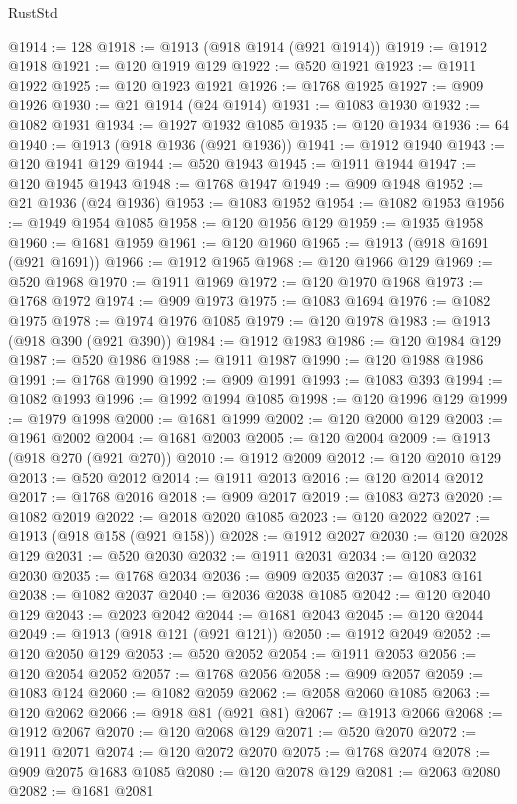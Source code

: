 \begin{lexlean}{RustStd}
\begin{coremodule}
@1914 := 128
@1918 := @1913 (@918 @1914 (@921 @1914))
@1919 := @1912 @1918
@1921 := @120 @1919 @129
@1922 := @520 @1921
@1923 := @1911 @1922
@1925 := @120 @1923 @1921
@1926 := @1768 @1925
@1927 := @909 @1926
@1930 := @21 @1914 (@24 @1914)
@1931 := @1083 @1930
@1932 := @1082 @1931
@1934 := @1927 @1932 @1085
@1935 := @120 @1934
@1936 := 64
@1940 := @1913 (@918 @1936 (@921 @1936))
@1941 := @1912 @1940
@1943 := @120 @1941 @129
@1944 := @520 @1943
@1945 := @1911 @1944
@1947 := @120 @1945 @1943
@1948 := @1768 @1947
@1949 := @909 @1948
@1952 := @21 @1936 (@24 @1936)
@1953 := @1083 @1952
@1954 := @1082 @1953
@1956 := @1949 @1954 @1085
@1958 := @120 @1956 @129
@1959 := @1935 @1958
@1960 := @1681 @1959
@1961 := @120 @1960
@1965 := @1913 (@918 @1691 (@921 @1691))
@1966 := @1912 @1965
@1968 := @120 @1966 @129
@1969 := @520 @1968
@1970 := @1911 @1969
@1972 := @120 @1970 @1968
@1973 := @1768 @1972
@1974 := @909 @1973
@1975 := @1083 @1694
@1976 := @1082 @1975
@1978 := @1974 @1976 @1085
@1979 := @120 @1978
@1983 := @1913 (@918 @390 (@921 @390))
@1984 := @1912 @1983
@1986 := @120 @1984 @129
@1987 := @520 @1986
@1988 := @1911 @1987
@1990 := @120 @1988 @1986
@1991 := @1768 @1990
@1992 := @909 @1991
@1993 := @1083 @393
@1994 := @1082 @1993
@1996 := @1992 @1994 @1085
@1998 := @120 @1996 @129
@1999 := @1979 @1998
@2000 := @1681 @1999
@2002 := @120 @2000 @129
@2003 := @1961 @2002
@2004 := @1681 @2003
@2005 := @120 @2004
@2009 := @1913 (@918 @270 (@921 @270))
@2010 := @1912 @2009
@2012 := @120 @2010 @129
@2013 := @520 @2012
@2014 := @1911 @2013
@2016 := @120 @2014 @2012
@2017 := @1768 @2016
@2018 := @909 @2017
@2019 := @1083 @273
@2020 := @1082 @2019
@2022 := @2018 @2020 @1085
@2023 := @120 @2022
@2027 := @1913 (@918 @158 (@921 @158))
@2028 := @1912 @2027
@2030 := @120 @2028 @129
@2031 := @520 @2030
@2032 := @1911 @2031
@2034 := @120 @2032 @2030
@2035 := @1768 @2034
@2036 := @909 @2035
@2037 := @1083 @161
@2038 := @1082 @2037
@2040 := @2036 @2038 @1085
@2042 := @120 @2040 @129
@2043 := @2023 @2042
@2044 := @1681 @2043
@2045 := @120 @2044
@2049 := @1913 (@918 @121 (@921 @121))
@2050 := @1912 @2049
@2052 := @120 @2050 @129
@2053 := @520 @2052
@2054 := @1911 @2053
@2056 := @120 @2054 @2052
@2057 := @1768 @2056
@2058 := @909 @2057
@2059 := @1083 @124
@2060 := @1082 @2059
@2062 := @2058 @2060 @1085
@2063 := @120 @2062
@2066 := @918 @81 (@921 @81)
@2067 := @1913 @2066
@2068 := @1912 @2067
@2070 := @120 @2068 @129
@2071 := @520 @2070
@2072 := @1911 @2071
@2074 := @120 @2072 @2070
@2075 := @1768 @2074
@2078 := @909 @2075 @1683 @1085
@2080 := @120 @2078 @129
@2081 := @2063 @2080
@2082 := @1681 @2081

\end{coremodule}
\end{lexlean}
